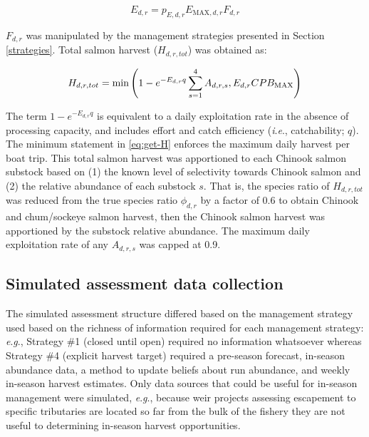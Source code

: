 \documentclass[12pt,]{book}
\theoremstyle{definition}
\theoremstyle{definition}
\theoremstyle{definition}
\theoremstyle{remark}
\begin{document}
\begin{equation}
  E_{d,r} = p_{E,d,r} E_{\text{MAX},d,r} F_{d,r}
  \label{eq:get-E}
\end{equation}

\noindent
\(F_{d,r}\) was manipulated by the management strategies presented in
Section \ref{strategies}. Total salmon harvest (\(H_{d,r,tot}\)) was
obtained as:

\begin{equation}
  H_{d,r,tot}=\text{min} \left(1 - e^{-E_{d,r} q} \sum_{s=1}^4 A_{d,r,s}, \space E_{d,r} CPB_{\text{MAX}} \right)
  \label{eq:get-H}
\end{equation}

\noindent
The term \(1 - e^{-E_{d,r} q}\) is equivalent to a daily exploitation
rate in the absence of processing capacity, and includes effort and
catch efficiency (\emph{i}.\emph{e}., catchability; \(q\)). The minimum
statement in \eqref{eq:get-H} enforces the maximum daily harvest per boat
trip. This total salmon harvest was apportioned to each Chinook salmon
substock based on (1) the known level of selectivity towards Chinook
salmon and (2) the relative abundance of each substock \(s\). That is,
the species ratio of \(H_{d,r,tot}\) was reduced from the true species
ratio \(\phi_{d,r}\) by a factor of 0.6 to obtain Chinook and
chum/sockeye salmon harvest, then the Chinook salmon harvest was
apportioned by the substock relative abundance. The maximum daily
exploitation rate of any \(A_{d,r,s}\) was capped at 0.9.

\subsection{Simulated assessment data
collection}\label{simulated-assessment-data-collection}

\noindent
The simulated assessment structure differed based on the management
strategy used based on the richness of information required for each
management strategy: \emph{e}.\emph{g}., Strategy \#1 (closed until
open) required no information whatsoever whereas Strategy \#4 (explicit
harvest target) required a pre-season forecast, in-season abundance
data, a method to update beliefs about run abundance, and weekly
in-season harvest estimates. Only data sources that could be useful for
in-season management were simulated, \emph{e}.\emph{g}., because weir
projects assessing escapement to specific tributaries are located so far
from the bulk of the fishery they are not useful to determining
in-season harvest opportunities.
\end{document}
